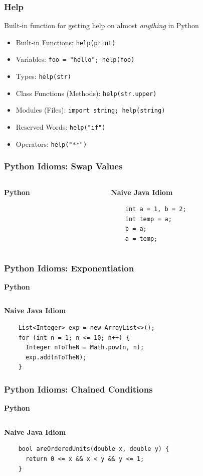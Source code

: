 \documentclass{beamer}
\begin{document}
\begin{frame}
  \frametitle{Help}
  Built-in function for getting help on almost \textit{anything} in Python
  \begin{itemize}
    \item Built-in Functions: \lstinline{help(print)}
    \item Variables: \lstinline{foo = "hello"; help(foo)}
    \item Types: \lstinline{help(str)}
    \item Class Functions (Methods): \lstinline{help(str.upper)}
    \item Modules (Files): \lstinline{import string; help(string)}
    \item Reserved Words: \lstinline{help("if")}
    \item Operators: \lstinline{help("**")}
  \end{itemize}
\end{frame}


\begin{frame}[fragile]
  \frametitle{Python Idioms: Swap Values}
  \begin{columns}
  \begin{column}{0.5\textwidth}
    \textbf{Python}
    \inputminted{python}{swap.py}
  \end{column}
  \begin{column}{0.5\textwidth}
  \textbf{Naive Java Idiom}
  \begin{lstlisting}
    int a = 1, b = 2;
    int temp = a;
    b = a;
    a = temp;
  \end{lstlisting}
  \end{column}
  \end{columns}
\end{frame}

\begin{frame}[fragile]
  \frametitle{Python Idioms: Exponentiation}
  \textbf{Python}
  \inputminted{python}{exponentiation.py}
  
  \textbf{Naive Java Idiom}
  \begin{lstlisting}
    List<Integer> exp = new ArrayList<>();
    for (int n = 1; n <= 10; n++) {
      Integer nToTheN = Math.pow(n, n);
      exp.add(nToTheN);
    }
  \end{lstlisting}
\end{frame}

\begin{frame}[fragile]
  \frametitle{Python Idioms: Chained Conditions}
  \textbf{Python}
  \inputminted{python}{ordered_units.py}
  
  \textbf{Naive Java Idiom}
  \begin{lstlisting}
    bool areOrderedUnits(double x, double y) {
      return 0 <= x && x < y && y <= 1;
    }
  \end{lstlisting}
\end{frame}
\end{document}
